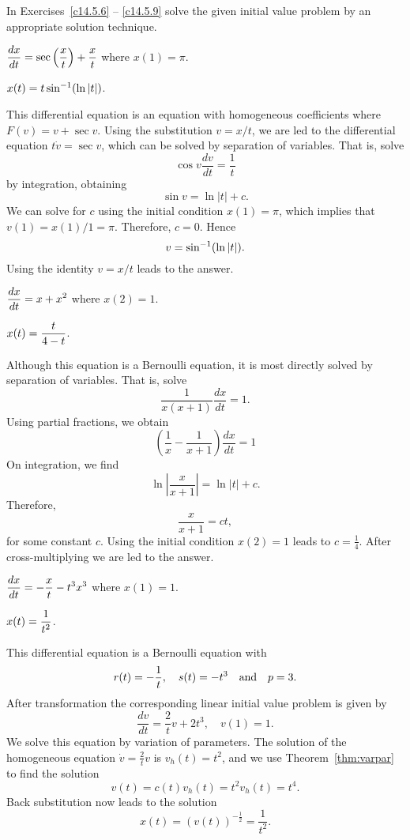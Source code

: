 \documentclass{ximera}
\begin{document}
\noindent In Exercises~\ref{c14.5.6} -- \ref{c14.5.9} solve the given initial 
value problem by an appropriate solution technique.
\begin{exercise} \label{c14.5.6}
$\displaystyle \frac{dx}{dt} = \sec\left(\frac{x}{t}\right)+\frac{x}{t}$ where
$x(1)=\pi$.

\begin{solution}
\ans $x(t) = t\sin^{-1}(\ln|t|)$.

\soln  This differential equation is an equation with homogeneous
coefficients where $F(v) = v + \sec v$.  Using the substitution $v=x/t$, we
are led to the differential equation $t\dot{v}=\sec v$, which can be solved
by separation of variables.  That is, solve
\[
\cos v \frac{dv}{dt} = \frac{1}{t}
\]
by integration, obtaining
\[
\sin v = \ln|t| + c.
\]
We can solve for $c$ using the initial condition $x(1)=\pi$, which implies
that $v(1)=x(1)/1=\pi$.  Therefore, $c=0$.  Hence
\[
v = \sin^{-1}(\ln|t|).
\]
Using the identity $v=x/t$ leads to the answer. 
 

\end{solution}
\end{exercise}
\begin{exercise} \label{c14.5.7}
$\displaystyle \frac{dx}{dt} = x+x^2$ where $x(2)=1$.

\begin{solution}
\ans $x(t) = \displaystyle\frac{t}{4-t}$.

\soln  Although this equation is a Bernoulli equation, it is most directly
solved by separation of variables.  That is, solve
\[
\frac{1}{x(x+1)}\frac{dx}{dt} = 1.
\]
Using partial fractions, we obtain
\[
\left(\frac{1}{x}-\frac{1}{x+1}\right)\frac{dx}{dt} = 1
\]
On integration, we find
\[
\ln\left|\frac{x}{x+1}\right| = \ln|t| + c.
\]
Therefore,
\[
\frac{x}{x+1} = ct,
\]
for some constant $c$.  Using the initial condition $x(2)=1$ leads to
$c=\frac{1}{4}$.  After cross-multiplying we are led to the answer.

\end{solution}
\end{exercise}
\begin{exercise} \label{c14.5.8}
$\displaystyle \frac{dx}{dt} = -\frac{x}{t}-t^3 x^3$ where $x(1)=1$.

\begin{solution}
\ans $x(t) = \displaystyle\frac{1}{t^2}$.

\soln This differential equation is a Bernoulli equation with
\[
r(t) = -\frac{1}{t},\quad s(t) = -t^3 \quad\mbox{and}\quad p=3.
\]
After transformation the corresponding linear initial value problem
is given by
\[
\frac{dv}{dt} = \frac{2}{t} v + 2t^3,\quad v(1)=1.
\]
We solve this equation by variation of parameters.  The solution
of the homogeneous equation $\dot v = \frac{2}{t} v$ is
$v_h(t)=t^2$, and we use Theorem~\ref{thm:varpar} to find the solution
\[
v(t) = c(t) v_h(t) = t^2 v_h(t) = t^4.
\]
Back substitution now leads to the solution
\[
x(t) = (v(t))^{-\frac{1}{2}} = \frac{1}{t^2}.
\]


\end{solution}
\end{exercise}
\end{document}
